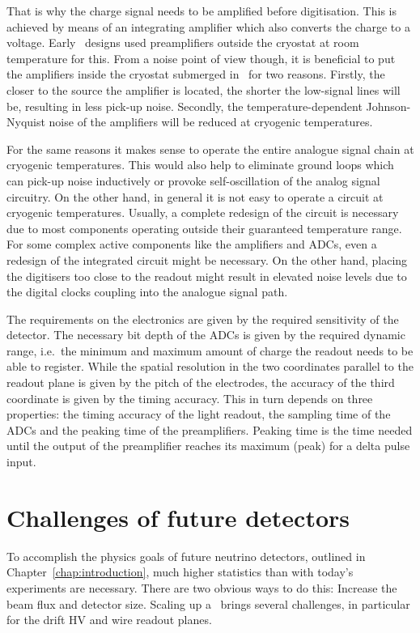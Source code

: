 That is why the charge signal needs to be amplified before digitisation.
This is achieved by means of an integrating amplifier which also converts the charge to a voltage.
Early \lartpc\ designs used preamplifiers outside the cryostat at room temperature for this.
From a noise point of view though, it is beneficial to put the amplifiers inside the cryostat submerged in \lar\ for two reasons.
Firstly, the closer to the source the amplifier is located, the shorter the low-signal lines will be, resulting in less pick-up noise.
Secondly, the temperature-dependent Johnson-Nyquist noise of the amplifiers will be reduced at cryogenic temperatures.

For the same reasons it makes sense to operate the entire analogue signal chain at cryogenic temperatures.
This would also help to eliminate ground loops which can pick-up noise inductively or provoke self-oscillation of the analog signal circuitry.
On the other hand, in general it is not easy to operate a circuit at cryogenic temperatures.
Usually, a complete redesign of the circuit is necessary due to most components operating outside their guaranteed temperature range.
For some complex active components like the amplifiers and ADCs, even a redesign of the integrated circuit might be necessary.
On the other hand, placing the digitisers too close to the readout might result in elevated noise levels due to the digital clocks coupling into the analogue signal path.

The requirements on the electronics are given by the required sensitivity of the detector.
The necessary bit depth of the ADCs is given by the required dynamic range, i.e.\ the minimum and maximum amount of charge the readout needs to be able to register.
While the spatial resolution in the two coordinates parallel to the readout plane is given by the pitch of the electrodes, the accuracy of the third coordinate is given by the timing accuracy.
This in turn depends on three properties: the timing accuracy of the light readout, the sampling time of the ADCs and the peaking time of the preamplifiers.
Peaking time is the time needed until the output of the preamplifier reaches its maximum (peak) for a delta pulse input.


\section{Challenges of future detectors\label{sec:lartpc_challenges}}
To accomplish the physics goals of future neutrino detectors, outlined in Chapter~\ref{chap:introduction}, much higher statistics than with today's experiments are necessary.
There are two obvious ways to do this: Increase the beam flux and detector size.
Scaling up a \lartpc\ brings several challenges, in particular for the drift HV and wire readout planes.

